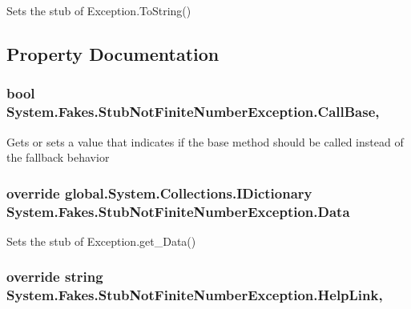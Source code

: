 Sets the stub of Exception.\-To\-String()



\subsection{Property Documentation}
\hypertarget{class_system_1_1_fakes_1_1_stub_not_finite_number_exception_ae9eeafde844653269f330a73948c7d05}{
\subsubsection[{Call\-Base}]{\setlength{\rightskip}{0pt plus 5cm}bool System.\-Fakes.\-Stub\-Not\-Finite\-Number\-Exception.\-Call\-Base\hspace{0.3cm}{\ttfamily [get]}, {\ttfamily [set]}}}\label{class_system_1_1_fakes_1_1_stub_not_finite_number_exception_ae9eeafde844653269f330a73948c7d05}


Gets or sets a value that indicates if the base method should be called instead of the fallback behavior

\hypertarget{class_system_1_1_fakes_1_1_stub_not_finite_number_exception_afe8df416cde40a6c2748eaea3ee8eeff}{
\subsubsection[{Data}]{\setlength{\rightskip}{0pt plus 5cm}override global.\-System.\-Collections.\-I\-Dictionary System.\-Fakes.\-Stub\-Not\-Finite\-Number\-Exception.\-Data\hspace{0.3cm}{\ttfamily [get]}}}\label{class_system_1_1_fakes_1_1_stub_not_finite_number_exception_afe8df416cde40a6c2748eaea3ee8eeff}


Sets the stub of Exception.\-get\-\_\-\-Data()

\hypertarget{class_system_1_1_fakes_1_1_stub_not_finite_number_exception_aa4be0b2f948724db3b6f9ad0d3010b79}{
\subsubsection[{Help\-Link}]{\setlength{\rightskip}{0pt plus 5cm}override string System.\-Fakes.\-Stub\-Not\-Finite\-Number\-Exception.\-Help\-Link\hspace{0.3cm}{\ttfamily [get]}, {\ttfamily [set]}}}\label{class_system_1_1_fakes_1_1_stub_not_finite_number_exception_aa4be0b2f948724db3b6f9ad0d3010b79}


